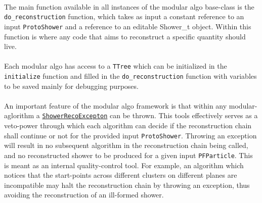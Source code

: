 \paragraph{}The main function available in all instances of the modular algo base-class is the \texttt{do\_reconstruction} function, which takes as input a constant reference to an input \texttt{ProtoShower} and a reference to an editable {Shower\_t} object. Within this function is where any code that aims to reconstruct a specific quantity should live.
\paragraph{}Each modular algo has access to a \texttt{TTree} which can be initialized in the \texttt{initialize} function and filled in the \texttt{do\_reconstruction} function with variables to be saved mainly for debugging purposes.
\paragraph{}An important feature of the modular algo framework is that within any modular-aglorithm a \href{https://github.com/larlight/larlite/blob/trunk/UserDev/RecoTool/ShowerReco3D/Base/ShowerRecoException.h}{\texttt{ShowerRecoExcepton}} can be thrown. This tools effectively serves as a veto-power through which each algorithm can decide if the reconstruction chain shall continue or not for the provided input \texttt{ProtoShower}. Throwing an exception will result in no subsequent algorithm in the reconstruction chain being called, and no reconstructed shower to be produced for a given input \texttt{PFParticle}. This is meant as an internal quality-control tool. For example, an algorithm which notices that the start-points across different clusters on different planes are incompatible may halt the reconstruction chain by throwing an exception, thus avoiding the reconstruction of an ill-formed shower.

